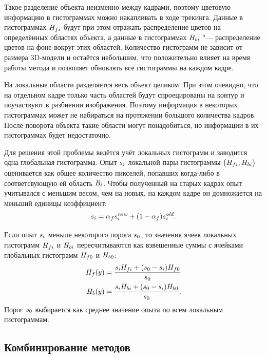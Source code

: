 Такое разделение объекта неизменно между кадрами, поэтому цветовую информацию
в гистограммах можно накапливать в ходе трекинга.
Данные в гистограммах $H_{fi}$ будут при этом отражать распределение
цветов на определённых областях объекта, а данные в гистограммах
$H_{bi}$ "--- распределение цветов на фоне вокруг этих областей.
Количество гистограмм не зависит от размера 3D-модели и остаётся небольшим, что
положительно влияет на время работы метода и позволяет обновлять все
гистограммы на каждом кадре.

На локальные области разделяется весь объект целиком.
При этом очевидно, что на отдельном кадре только часть областей будут
спроецированы на контур и поучаствуют в разбиении изображения.
Поэтому информация в некоторых гистограммах может не набираться на протяжении
большого количества кадров.
После поворота объекта такие области могут понадобиться, но информации в
их гистограммах будет недостаточно.

Для решения этой проблемы ведётся учёт  локальных гистограмм и
заводится одна глобальная гистограмма.
Опыт $s_{i}$ локальной пары гистограммы
$\left( H_{fi}, H_{bi} \right)$
оценивается как общее количество пикселей, попавших
когда-либо в соответсвующую ей область $B_{i}$.
Чтобы полученный на старых кадрах опыт учитывался с меньшим весом, чем на
новых, на каждом кадре он домножается на меньший единицы коэффициент:
\begin{equation}
    s_{i} = \alpha_{f} s_{i}^{\text{\it new}} + (1 - \alpha_{f}) s_{i}^{\text{\it old}}
\text{.}
\end{equation}

Если опыт $s_{i}$ меньше некоторого порога $s_{0}$,
то значения ячеек локальных гистограмм
$H_{fi}$ и $H_{bi}$
пересчитываются как взвешенные суммы с ячейками глобальных гистограмм
$H_{f0}$ и $H_{b0}$:
\begin{align}\label{eqn:histo_skill}
    H_{f}(y) &= \dfrac{s_{i} H_{fi} + (s_{0} - s_{i}) H_{f0}}{s_{0}} \\
    H_{b}(y) &= \dfrac{s_{i} H_{bi} + (s_{0} - s_{i}) H_{b0}}{s_{0}}
\text{.}
\end{align}
Порог $s_{0}$ выбирается как среднее значение опыта по всем локальным
гистограммам.


\subsection{Комбинирование методов}\label{combining}


